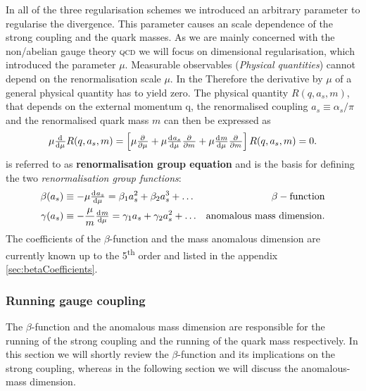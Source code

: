 \documentclass[../../index.tex]{subfiles}
\begin{document}
In all of the three regularisation schemes we introduced an arbitrary parameter
to regularise the divergence. This parameter causes an scale dependence of the
strong coupling and the quark masses. As we are mainly concerned with the
non\-/abelian gauge theory \textsc{qcd} we will focus on dimensional
regularisation, which introduced the parameter $\mu$. Measurable observables
(\textit{Physical quantities}) cannot depend on the renormalisation scale $\mu$.
In the Therefore the derivative by $\mu$ of a general physical quantity has to
yield zero. The physical quantity $R(q, a_s, m)$, that depends on the external
momentum q, the renormalised coupling $a_s\equiv\alpha_s/\pi$ and the
renormalised quark mass $m$ can then be expressed as
\begin{equation}
  \label{eq:RGE}
  \mu \od{}{\mu}R(q, a_s, m) = \left[ \mu \pd{}{\mu} + \mu \od{a_s}{\mu} \pd{}{m} + \mu \od{m}{\mu} \pd{}{m} \right] R(q, a_s, m) = 0.
\end{equation}
 is referred to as \textbf{renormalisation group equation} and is
the basis for defining the two \textit{renormalisation group functions}:
\begin{align}
  \beta(a_s) &\equiv -\mu \od{a_s}{\mu} = \beta_1 a_s^2 + \beta_2 a_s^3 + \dots & \beta-\text{function}
                                                                                  \label{eq:betaFunction} \\
  \gamma(a_s) &\equiv - \frac{\mu}{m} \od{m}{\mu} = \gamma_1 a_s + \gamma_2 a_s^2 + \dots & \text{anomalous mass dimension}.
                                                                                            \label{eq:anomalousMassDimension}
\end{align}
The coefficients of the $\beta$-function and the mass anomalous dimension are
currently known up to the 5\textsuperscript{th} order and listed in the appendix
\ref{sec:betaCoefficients}.

\subsubsection{Running gauge coupling}
The $\beta$-function and the anomalous mass dimension are responsible for the
running of the strong coupling and the running of the quark mass respectively.
In this section we will shortly review the $\beta$-function and its implications
on the strong coupling, whereas in the following section we will discuss the
anomalous-mass dimension.
\end{document}
